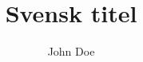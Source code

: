 \documentclass[ida, 10pt, english, crop, info, print]{liuthesis}
\author{John Doe}
\title{Svensk titel}{English Title}
\date{}
\begin{document}
\makeFrontMatter

\newpage

\tableofcontents






\backmatter

\appendix

\end{document}
